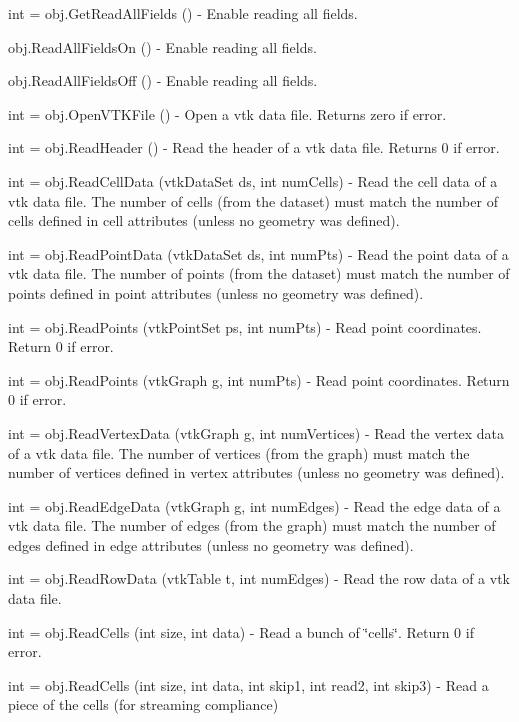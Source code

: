 \begin{DoxyItemize}
\item {\ttfamily int = obj.\-Get\-Read\-All\-Fields ()} -\/ Enable reading all fields.  
\item {\ttfamily obj.\-Read\-All\-Fields\-On ()} -\/ Enable reading all fields.  
\item {\ttfamily obj.\-Read\-All\-Fields\-Off ()} -\/ Enable reading all fields.  
\item {\ttfamily int = obj.\-Open\-V\-T\-K\-File ()} -\/ Open a vtk data file. Returns zero if error.  
\item {\ttfamily int = obj.\-Read\-Header ()} -\/ Read the header of a vtk data file. Returns 0 if error.  
\item {\ttfamily int = obj.\-Read\-Cell\-Data (vtk\-Data\-Set ds, int num\-Cells)} -\/ Read the cell data of a vtk data file. The number of cells (from the dataset) must match the number of cells defined in cell attributes (unless no geometry was defined).  
\item {\ttfamily int = obj.\-Read\-Point\-Data (vtk\-Data\-Set ds, int num\-Pts)} -\/ Read the point data of a vtk data file. The number of points (from the dataset) must match the number of points defined in point attributes (unless no geometry was defined).  
\item {\ttfamily int = obj.\-Read\-Points (vtk\-Point\-Set ps, int num\-Pts)} -\/ Read point coordinates. Return 0 if error.  
\item {\ttfamily int = obj.\-Read\-Points (vtk\-Graph g, int num\-Pts)} -\/ Read point coordinates. Return 0 if error.  
\item {\ttfamily int = obj.\-Read\-Vertex\-Data (vtk\-Graph g, int num\-Vertices)} -\/ Read the vertex data of a vtk data file. The number of vertices (from the graph) must match the number of vertices defined in vertex attributes (unless no geometry was defined).  
\item {\ttfamily int = obj.\-Read\-Edge\-Data (vtk\-Graph g, int num\-Edges)} -\/ Read the edge data of a vtk data file. The number of edges (from the graph) must match the number of edges defined in edge attributes (unless no geometry was defined).  
\item {\ttfamily int = obj.\-Read\-Row\-Data (vtk\-Table t, int num\-Edges)} -\/ Read the row data of a vtk data file.  
\item {\ttfamily int = obj.\-Read\-Cells (int size, int data)} -\/ Read a bunch of \char`\"{}cells\char`\"{}. Return 0 if error.  
\item {\ttfamily int = obj.\-Read\-Cells (int size, int data, int skip1, int read2, int skip3)} -\/ Read a piece of the cells (for streaming compliance)  

\end{DoxyItemize}
